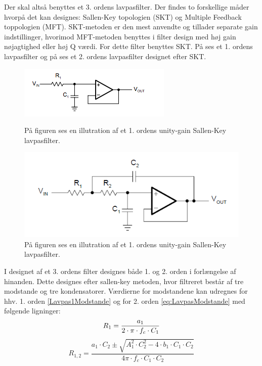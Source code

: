 Der skal altså benyttes et 3. ordens lavpasfilter. Der findes to forskellige måder hvorpå det kan designes: Sallen-Key topologien (SKT) og Multiple Feedback toppologien (MFT). SKT-metoden er den mest anvendte og tillader separate gain indstillinger, hvorimod MFT-metoden benyttes i filter design med høj gain nøjagtighed eller høj Q værdi. For dette filter benyttes SKT. På  ses et 1. ordens lavpasfilter og på  ses et 2. ordens lavpasfilter designet efter SKT. \cite{Carter2013}
	
\begin{figure}[H]
	\centering
	\begin{minipage}[b]{0.45\textwidth}
		\includegraphics[width=\textwidth]{figures/cProblemloesning/Lavpasfilter1_teoretisk.PNG}
		\caption{På figuren ses en illutration af et 1. ordens unity-gain Sallen-Key lavpasfilter.}
		\label{fig:SallenKey1}
	\end{minipage}
	\hfill
	\begin{minipage}[b]{0.45\textwidth}
		\includegraphics[width=\textwidth]{figures/cProblemloesning/Sallenlavpas.PNG}
		\caption{På figuren ses en illutration af et 1. ordens unity-gain Sallen-Key lavpasfilter.}
		\label{fig:SallenKey2}
	\end{minipage}
\end{figure}

I designet af et 3. ordens filter designes både 1. og 2. orden i forlængelse af hinanden. Dette designes efter sallen-key metoden, hvor filtreret består af tre modstande og tre kondensatorer. Værdierne for modstandene kan udregnes for hhv. 1. orden \ref{Lavpas1Modstande} og for 2. orden \eqref{eq:LavpasModstande} med følgende ligninger:
\begin{equation} \label{Lavpas1Modstande}
R_{1} = \frac{a_1}{2 \cdot \pi \cdot f_c \cdot C_1} \\
\end{equation}
\begin{equation}
 \label{eq:LavpasModstande}
R_{1,2} = \frac{a_1 \cdot C_2 \pm \sqrt{A_1^2 \cdot C_2^2 - 4 \cdot b_1 \cdot C_1 \cdot C_2}}{4 \pi \cdot f_c \cdot C_1 \cdot C_2}
\end{equation}

